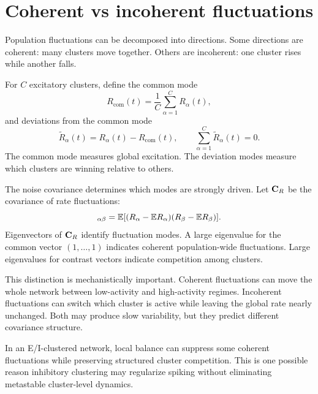 \section{Coherent vs incoherent fluctuations}
\label{sec:coherent-vs-incoherent-fluctuations}

Population fluctuations can be decomposed into directions. Some directions are coherent: many clusters move together. Others are incoherent: one cluster rises while another falls.

For $C$ excitatory clusters, define the common mode
%
\begin{equation}
  R_{\mathrm{com}}(t)
  =
  \frac{1}{C}\sum_{\alpha=1}^C R_\alpha(t),
  \label{eq:common-mode}
\end{equation}
%
and deviations from the common mode
%
\begin{equation}
  \widetilde R_\alpha(t)
  =
  R_\alpha(t)-R_{\mathrm{com}}(t),
  \qquad
  \sum_{\alpha=1}^C \widetilde R_\alpha(t)=0.
  \label{eq:deviation-modes}
\end{equation}
%
The common mode measures global excitation. The deviation modes measure which clusters are winning relative to others.

The noise covariance determines which modes are strongly driven. Let $\mathbf{C}_R$ be the covariance of rate fluctuations:
%
\begin{equation}
  [\mat C_R]_{\alpha\beta}
  =
  \E[(R_\alpha-\E R_\alpha)(R_\beta-\E R_\beta)].
  \label{eq:rate-covariance-matrix}
\end{equation}
%
Eigenvectors of $\mathbf{C}_R$ identify fluctuation modes. A large eigenvalue for the common vector $(1,\ldots,1)$ indicates coherent population-wide fluctuations. Large eigenvalues for contrast vectors indicate competition among clusters.

This distinction is mechanistically important. Coherent fluctuations can move the whole network between low-activity and high-activity regimes. Incoherent fluctuations can switch which cluster is active while leaving the global rate nearly unchanged. Both may produce slow variability, but they predict different covariance structure.

In an E/I-clustered network, local balance can suppress some coherent fluctuations while preserving structured cluster competition. This is one possible reason inhibitory clustering may regularize spiking without eliminating metastable cluster-level dynamics.

